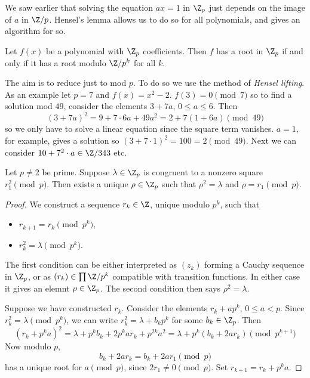 \documentclass[a4paper]{article}
\begin{document}
We saw earlier that solving the equation \(ax = 1\) in \(\Z_p\) just depends on the image of \(a\) in \(\Z/p\). Hensel's lemma allows us to do so for all polynomials, and gives an algorithm for so.

\begin{lemma}
  Let \(f(x)\) be a polynomial with \(\Z_p\) coefficients. Then \(f\) has a root in \(\Z_p\) if and only if it has a root modulo \(\Z/p^k\) for all \(k\).
\end{lemma}

The aim is to reduce just to mod \(p\). To do so we use the method of \emph{Hensel lifting}. As an example let \(p = 7\) and \(f(x) = x^2 - 2\). \(f(3) = 0 \pmod 7\) so to find a solution mod \(49\), consider the elements \(3 + 7a\), \(0 \leq a \leq 6\). Then
\[
  (3 + 7a)^2 = 9 + 7 \cdot 6a + 49 a^2 = 2 + 7 (1 + 6a) \pmod{49}
\]
so we only have to solve a linear equation since the square term vanishes. \(a = 1\), for example, gives a solution so \((3 + 7 \cdot 1)^2 = 100 = 2 \pmod{49}\). Next we can consider \(10 + 7^2 \cdot a \in \Z/343\) etc.

\begin{proposition}
  Let \(p \ne 2\) be prime. Suppose \(\lambda \in \Z_p\) is congruent to a nonzero square \(r_1^2 \pmod p\). Then exists a unique \(\rho \in \Z_p\) such that \(\rho^2 = \lambda\) and \(\rho = r_1 \pmod p\).
\end{proposition}

\begin{proof}
  We construct a sequence \(r_k \in \Z\), unique modulo \(p^k\), such that
  \begin{itemize}
  \item \(r_{k + 1} = r_k \pmod{p^k}\),
  \item \(r_k^2 = \lambda \pmod{p^k}\).
  \end{itemize}
  The first condition can be either interpreted as \((z_k)\) forming a Cauchy sequence in \(\Z_p\), or as \((r_k) \in \prod \Z/p^k\) compatible with transition functions. In either case it gives an elemnt \(\rho \in \Z_p\). The second condition then says \(\rho^2 = \lambda\).

  Suppose we have constructed \(r_k\). Consider the elements \(r_k + ap^k\), \(0 \leq a < p\). Since \(r_k^2 = \lambda \pmod{p^k}\), we can write \(r_k^2 = \lambda + b_k p^k\) for some \(b_k \in \Z_p\). Then
  \[
    (r_k + p^ka)^2 = \lambda + p^kb_k + 2p^ka r_k + p^{2k} a^2
    = \lambda + p^k(b_k + 2a r_k) \pmod{p^{k + 1}}
  \]
  Now modulo \(p\),
  \[
    b_k + 2ar_k = b_k + 2ar_1 \pmod p
  \]
  has a unique root for \(a \pmod p\), since \(2r_1 \ne 0 \pmod p\). Set \(r_{k + 1} = r_k + p^k a\).
\end{proof}
\end{document}
